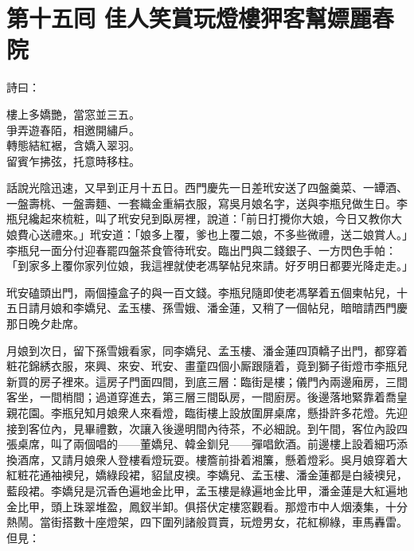
\chapter*{第十五囘 佳人笑賞玩燈樓狎客幫嫖麗春院}


詩曰：

\begin{myquote}
樓上多嬌艷，當窓並三五。\\爭弄遊春陌，相邀開繡戶。\\轉態結紅裾，含嬌入翠羽。\\留賓乍拂弦，托意時移柱。
\end{myquote}

話說光陰迅速，又早到正月十五日。西門慶先一日差玳安送了四盤羹菜、一罈酒、一盤壽桃、一盤壽麵、一套織金重絹衣服，寫吳月娘名字，送與李瓶兒做生日。李瓶兒纔起來梳粧，叫了玳安兒到臥房裡，說道：「前日打攪你大娘，今日又教你大娘費心送禮來。」玳安道：「娘多上覆，爹也上覆二娘，{}不多些微禮，送二娘賞人。」李瓶兒一面分付迎春罷四盤茶食管待玳安。臨出門與二錢銀子、一方閃色手帕：「到家多上覆你家列位娘，我這裡就使老馮拏帖兒來請。好歹明日都要光降走走。」

玳安磕頭出門，兩個擡盒子的與一百文錢。李瓶兒隨即使老馮拏着五個柬帖兒，十五日請月娘和李嬌兒、孟玉樓、孫雪娥、潘金蓮，又稍了一個帖兒，暗暗請西門慶那日晚夕赴席。

月娘到次日，留下孫雪娥看家，同李嬌兒、孟玉樓、潘金蓮四頂轎子出門，都穿着粧花錦綉衣服，來興、來安、玳安、畫童四個小厮跟隨着，竟到獅子街燈市李瓶兒新買的房子裡來。這房子門面四間，到底三層：臨街是樓；儀門內兩邊廂房，三間客坐，一間梢間；過道穿進去，第三層三間臥房，一間廚房。後邊落地緊靠着喬皇親花園。{}李瓶兒知月娘衆人來看燈，臨街樓上設放圍屏桌席，懸掛許多花燈。先迎接到客位內，見畢禮數，次讓入後邊明間內待茶，不必細說。到午間，客位內設四張桌席，叫了兩個唱的——董嬌兒、韓金釧兒——彈唱飲酒。前邊樓上設着細巧添換酒席，又請月娘衆人登樓看燈玩耍。樓簷前掛着湘簾，懸着燈彩。吳月娘穿着大紅粧花通袖襖兒，嬌綠段裙，貂鼠皮襖。李嬌兒、孟玉樓、潘金蓮都是白綾襖兒，藍段裙。李嬌兒是沉香色遍地金比甲，孟玉樓是綠遍地金比甲，潘金蓮是大紅遍地金比甲，頭上珠翠堆盈，鳳釵半卸。俱搭伏定樓窓觀看。那燈市中人烟湊集，十分熱鬧。當街搭數十座燈架，四下圍列諸般買賣，玩燈男女，花紅柳綠，車馬轟雷。但見：

